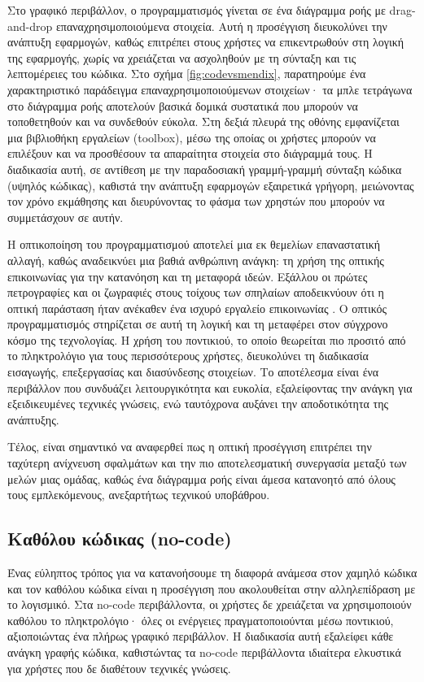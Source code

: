                 Στο γραφικό περιβάλλον, ο προγραμματισμός γίνεται σε ένα διάγραμμα ροής με drag-and-drop επαναχρησιμοποιούμενα στοιχεία. Αυτή η προσέγγιση διευκολύνει την ανάπτυξη εφαρμογών, καθώς επιτρέπει στους χρήστες να επικεντρωθούν στη λογική της εφαρμογής, χωρίς να χρειάζεται να ασχοληθούν με τη σύνταξη και τις λεπτομέρειες του κώδικα. Στο σχήμα \ref{fig:codevsmendix}, παρατηρούμε ένα χαρακτηριστικό παράδειγμα επαναχρησιμοποιούμενων στοιχείων· τα μπλε τετράγωνα στο διάγραμμα ροής αποτελούν βασικά δομικά συστατικά που μπορούν να τοποθετηθούν και να συνδεθούν εύκολα. Στη δεξιά πλευρά της οθόνης εμφανίζεται μια βιβλιοθήκη εργαλείων (toolbox), μέσω της οποίας οι χρήστες μπορούν να επιλέξουν και να προσθέσουν τα απαραίτητα στοιχεία στο διάγραμμά τους. Η διαδικασία αυτή, σε αντίθεση με την παραδοσιακή γραμμή-γραμμή σύνταξη κώδικα (υψηλός κώδικας), καθιστά την ανάπτυξη εφαρμογών εξαιρετικά γρήγορη, μειώνοντας τον χρόνο εκμάθησης και διευρύνοντας το φάσμα των χρηστών που μπορούν να συμμετάσχουν σε αυτήν.

                Η οπτικοποίηση του προγραμματισμού αποτελεί μια εκ θεμελίων επαναστατική αλλαγή, καθώς αναδεικνύει μια βαθιά ανθρώπινη ανάγκη: τη χρήση της οπτικής επικοινωνίας για την κατανόηση και τη μεταφορά ιδεών. Εξάλλου οι πρώτες πετρογραφίες και οι ζωγραφιές στους τοίχους των σπηλαίων αποδεικνύουν ότι η οπτική παράσταση ήταν ανέκαθεν ένα ισχυρό εργαλείο επικοινωνίας \cite{CASEKuhn}. Ο οπτικός προγραμματισμός στηρίζεται σε αυτή τη λογική και τη μεταφέρει στον σύγχρονο κόσμο της τεχνολογίας. Η χρήση του ποντικιού, το οποίο θεωρείται πιο προσιτό από το πληκτρολόγιο για τους περισσότερους χρήστες, διευκολύνει τη διαδικασία εισαγωγής, επεξεργασίας και διασύνδεσης στοιχείων. Το αποτέλεσμα είναι ένα περιβάλλον που συνδυάζει λειτουργικότητα και ευκολία, εξαλείφοντας την ανάγκη για εξειδικευμένες τεχνικές γνώσεις, ενώ ταυτόχρονα αυξάνει την αποδοτικότητα της ανάπτυξης.

                Τέλος, είναι σημαντικό να αναφερθεί πως η οπτική προσέγγιση επιτρέπει την ταχύτερη ανίχνευση σφαλμάτων και την πιο αποτελεσματική συνεργασία μεταξύ των μελών μιας ομάδας, καθώς ένα διάγραμμα ροής είναι άμεσα κατανοητό από όλους τους εμπλεκόμενους, ανεξαρτήτως τεχνικού υποβάθρου.

            \subsection{Καθόλου κώδικας (no-code)}
                Ένας εύληπτος τρόπος για να κατανοήσουμε τη διαφορά ανάμεσα στον χαμηλό κώδικα και τον καθόλου κώδικα είναι η προσέγγιση που ακολουθείται στην αλληλεπίδραση με το λογισμικό. Στα no-code περιβάλλοντα, οι χρήστες δε χρειάζεται να χρησιμοποιούν καθόλου το πληκτρολόγιο· όλες οι ενέργειες πραγματοποιούνται μέσω ποντικιού, αξιοποιώντας ένα πλήρως γραφικό περιβάλλον. Η διαδικασία αυτή εξαλείφει κάθε ανάγκη γραφής κώδικα, καθιστώντας τα no-code περιβάλλοντα ιδιαίτερα ελκυστικά για χρήστες που δε διαθέτουν τεχνικές γνώσεις.

